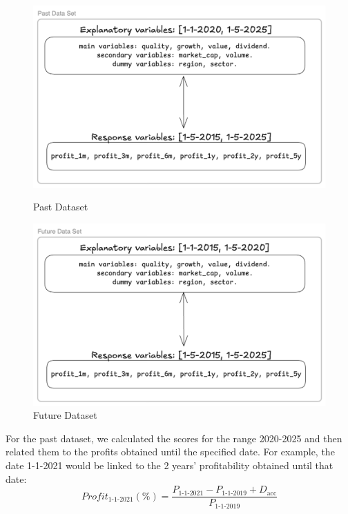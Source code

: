 \documentclass[11pt,english,a4paper,hidelinks]{book}
\begin{document}
\begin{figure}[H]
    \begin{minipage}{0.48\textwidth}
        \centering
        \includegraphics[width=\textwidth]{images/code/descriptive analysis/1st Dataset.png}
        \caption{Past Dataset}
        \label{fig:1st_dataset}
    \end{minipage}
    \hfill
    \begin{minipage}{0.48\textwidth}
        \centering
        \includegraphics[width=\textwidth]{images/code/descriptive analysis/2nd Dataset.png}
        \caption{Future Dataset}
        \label{fig:2nd_dataset}
    \end{minipage}
\end{figure}

\noindent For the past dataset, we calculated the scores for the range 2020-2025 and then related them to the profits obtained until the specified date. For example, the date 1-1-2021 would be linked to the 2 years' profitability obtained until that date: 
\begin{equation}
    Profit_{1\text{-}1\text{-}2021}(\%) = \frac{P_{1\text{-}1\text{-}2021} - P_{1\text{-}1\text{-}2019} + D_{\text{acc}}}{P_{1\text{-}1\text{-}2019}}
\end{equation}
\end{document}

